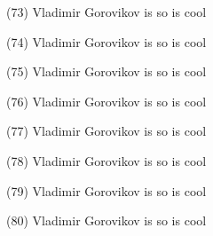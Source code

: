 \documentclass{article}%
\begin{document}
\newline%
\begin{minipage}{0.3333333333333333\textwidth}%
(73) Vladimir Gorovikov%
\newline%
%
is so%
\newline%
%
is cool%
\newline%
%
\end{minipage}%
\begin{minipage}{0.3333333333333333\textwidth}%
(74) Vladimir Gorovikov%
\newline%
%
is so%
\newline%
%
is cool%
\newline%
%
\end{minipage}%
\begin{minipage}{0.3333333333333333\textwidth}%
(75) Vladimir Gorovikov%
\newline%
%
is so%
\newline%
%
is cool%
\newline%
%
\end{minipage}%
\newline%
\begin{minipage}{0.3333333333333333\textwidth}%
(76) Vladimir Gorovikov%
\newline%
%
is so%
\newline%
%
is cool%
\newline%
%
\end{minipage}%
\begin{minipage}{0.3333333333333333\textwidth}%
(77) Vladimir Gorovikov%
\newline%
%
is so%
\newline%
%
is cool%
\newline%
%
\end{minipage}%
\begin{minipage}{0.3333333333333333\textwidth}%
(78) Vladimir Gorovikov%
\newline%
%
is so%
\newline%
%
is cool%
\newline%
%
\end{minipage}%
\newline%
\begin{minipage}{0.3333333333333333\textwidth}%
(79) Vladimir Gorovikov%
\newline%
%
is so%
\newline%
%
is cool%
\newline%
%
\end{minipage}%
\begin{minipage}{0.3333333333333333\textwidth}%
(80) Vladimir Gorovikov%
\newline%
%
is so%
\newline%
%
is cool%
\newline%
%
\end{minipage}%
\end{document}
